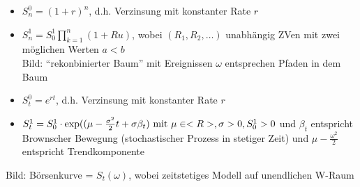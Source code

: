 \begin{*example}
	\begin{itemize}
		\item $S^0_n = (1+r)^n$, d.h. Verzinsung mit konstanter Rate $r$
		\item $S^1_n = S_0^1 \prod_{k=1}^n(1+Ru)$, wobei $(R_1, R_2, \dots)$ unabhängig ZVen mit zwei möglichen Werten $a < b$\\
		Bild: ``rekonbinierter Baum'' mit Ereignissen $\omega$ entsprechen Pfaden in dem Baum
	\end{itemize}
\end{*example}
\begin{*example}
	\begin{itemize}
		\item $S^0_t = e^{rt}$, d.h. Verzinsung mit konstanter Rate $r$
		\item $S_t^1 = S_0^1\cdot \exp((\mu - \frac{\sigma^2}{2}t + \sigma\beta_t) \text{ mit } \mu \in <R>, \sigma > 0, S^1_0 >0$ und $\beta_t$ entspricht Brownscher Bewegung (stochastischer Prozess in stetiger Zeit) und $\mu - \frac{\omega^2}{2}$ entspricht Trendkomponente
	\end{itemize}
	Bild: Börsenkurve = $S_t(\omega)$, wobei zeitstetiges Modell auf unendlichen W-Raum
\end{*example}
